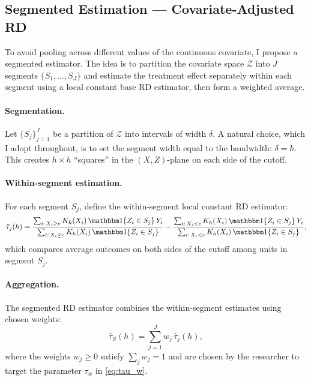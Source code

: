 \subsection{Segmented Estimation --- Covariate-Adjusted RD}\label{sec:setup:segmented}

To avoid pooling across different values of the continuous covariate, I propose a segmented estimator.
The idea is to partition the covariate space $\mathcal{Z}$ into $J$ segments $\{S_1, \ldots, S_J\}$ and estimate the treatment effect separately within each segment using a local constant base RD estimator, then form a weighted average.

\paragraph{Segmentation.}
Let $\{S_j\}_{j=1}^J$ be a partition of $\mathcal{Z}$ into intervals of width $\delta$.
A natural choice, which I adopt throughout, is to set the segment width equal to the bandwidth: $\delta = h$.
This creates $h \times h$ ``squares'' in the $(X, Z)$-plane on each side of the cutoff.

\paragraph{Within-segment estimation.}
For each segment $S_j$, define the within-segment local constant RD estimator:
\begin{equation}\label{eq:tau_j}
	\hat{\tau}_j(h) = \frac{\sum_{i:\, X_i \geq c} K_h(X_i)\, \ind\{Z_i \in S_j\}\, Y_i}{\sum_{i:\, X_i \geq c} K_h(X_i)\, \ind\{Z_i \in S_j\}} - \frac{\sum_{i:\, X_i < c} K_h(X_i)\, \ind\{Z_i \in S_j\}\, Y_i}{\sum_{i:\, X_i < c} K_h(X_i)\, \ind\{Z_i \in S_j\}},
\end{equation}
which compares average outcomes on both sides of the cutoff among units in segment $S_j$.

\paragraph{Aggregation.}
The segmented RD estimator combines the within-segment estimates using chosen weights:
\begin{equation}\label{eq:tau_seg}
	\hat{\tau}_S(h) = \sum_{j=1}^{J} w_j\, \hat{\tau}_j(h),
\end{equation}
where the weights $w_j \geq 0$ satisfy $\sum_j w_j = 1$ and are chosen by the researcher to target the parameter $\tau_w$ in \cref{eq:tau_w}.

